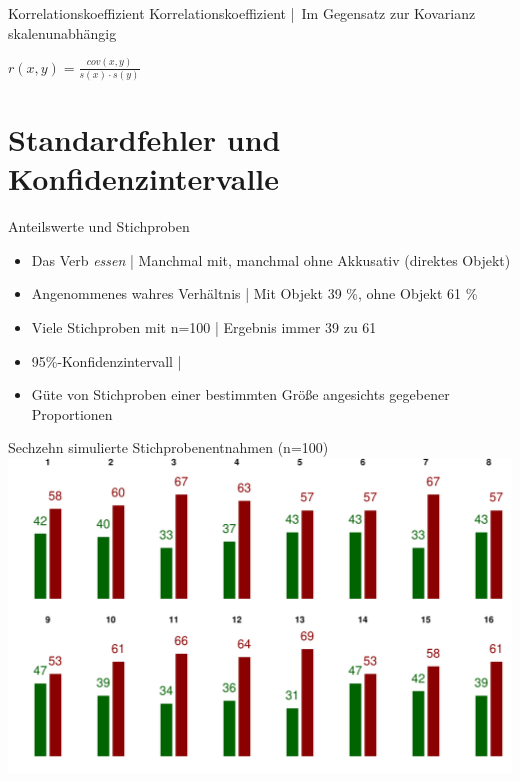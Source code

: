 \begin{frame}
  {Korrelationskoeffizient}
  \alert{Korrelationskoeffizient} | Im Gegensatz zur Kovarianz \alert{skalenunabhängig}\\
  \vspace{3\baselineskip}
  \begin{center}
    $r(x,y)=\frac{cov(x,y)}{s(x)\cdot s(y)}$\\
    \Zeile
  \end{center}
\end{frame}



\section{Standardfehler und Konfidenzintervalle}

\begin{frame}
  {Anteilswerte und Stichproben}
  \begin{itemize}[<+->]
    \item Das Verb \textit{essen} | Manchmal mit, manchmal ohne Akkusativ (direktes Objekt)
    \item Angenommenes wahres Verhältnis | \alert{Mit Objekt 39 \%, ohne Objekt 61 \%}
      \Halbzeile
    \item Viele Stichproben mit n=100 | Ergebnis  immer 39 zu 61
     \Doppelzeile 
    \item \alert{95\%-Konfidenzintervall} | 
    \item Güte von Stichproben einer bestimmten Größe angesichts gegebener Proportionen
  \end{itemize}
\end{frame}


\begin{frame}
  {Sechzehn simulierte Stichprobenentnahmen (n=100)}
  \centering 
  \includegraphics[height=0.8\textheight]{RVorlesung/sixteenbernoullis}
\end{frame}

